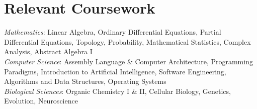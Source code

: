 \section{Relevant Coursework }
  {\sl Mathematics}: Linear Algebra, Ordinary Differential Equations, Partial Differential Equations, Topology, Probability, Mathematical Statistics, Complex Analysis, Abstract Algebra I\\
  {\sl Computer Science}: Assembly Language \& Computer Architecture, Programming Paradigms, Introduction to Artificial Intelligence, Software Engineering, Algorithms and Data Structures, Operating Systems \\
  {\sl Biological Sciences}: Organic Chemistry I \& II, Cellular Biology, Genetics, Evolution, Neuroscience
\vspace{-3.5mm}
